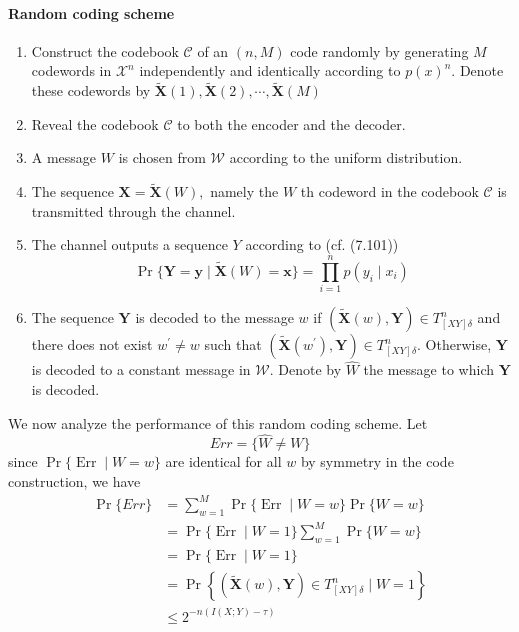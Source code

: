\documentclass[8pt]{article}
\begin{document}
\begin{tcolorbox}
\paragraph{Random coding scheme}
\begin{enumerate}
	\item Construct the codebook $\mathcal{C}$ of an $(n, M)$ code randomly by generating $M$ codewords in $\mathcal{X}^{n}$ independently and identically according to $p(x)^{n} .$ Denote these codewords by $\tilde{\mathbf{X}}(1), \tilde{\mathbf{X}}(2), \cdots, \tilde{\mathbf{X}}(M)$
	\item Reveal the codebook $\mathcal{C}$ to both the encoder and the decoder.
	\item A message $W$ is chosen from $\mathcal{W}$ according to the uniform distribution.
	\item The sequence $\mathbf{X}=\tilde{\mathbf{X}}(W),$ namely the $W$ th codeword in the codebook $\mathcal{C}$ is transmitted through the channel.
	\item The channel outputs a sequence $Y$ according to 	(cf. (7.101))
	$$
	\operatorname{Pr}\{\mathbf{Y}=\mathbf{y} \mid \tilde{\mathbf{X}}(W)=\mathbf{x}\}=\prod_{i=1}^{n} p\left(y_{i} \mid x_{i}\right)
	$$
	\item The sequence $\mathbf{Y}$ is decoded to the message $w$ if $(\tilde{\mathbf{X}}(w), \mathbf{Y}) \in T_{[X Y] \delta}^{n}$ and there does not exist $w^{\prime} \neq w$ such that $\left(\tilde{\mathbf{X}}\left(w^{\prime}\right), \mathbf{Y}\right) \in T_{[X Y] \delta}^{n} .$ Otherwise, $\mathbf{Y}$ is decoded to a constant message in $\mathcal{W}$. Denote by $\hat{W}$ the message to which $\mathbf{Y}$ is decoded.
\end{enumerate}
\end{tcolorbox}
We now analyze the performance of this random coding scheme. Let
$$
E r r=\{\hat{W} \neq W\}
$$
since $\operatorname{Pr}\{\operatorname{Err} \mid W=w\}$ are identical for all $w$ by symmetry in the code construction, we have
$$
\begin{aligned}
\operatorname{Pr}\{E r r\} &=\sum_{w=1}^{M} \operatorname{Pr}\{\operatorname{Err} \mid W=w\} \operatorname{Pr}\{W=w\} \\
& = \operatorname{Pr}\{\operatorname{Err} \mid W=1\} \sum_{w=1}^{M} \operatorname{Pr}\{W=w\}  \\
& = \operatorname{Pr}\{\operatorname{Err} \mid W=1\} \\
& =\operatorname{Pr}\left\{(\tilde{\mathbf{X}}(w), \mathbf{Y}) \in T_{[X Y] \delta}^{n} \mid W=1\right\} \\
&\leq 2^{-n(I(X ; Y)-\tau)}
\end{aligned}
$$
\end{document}
